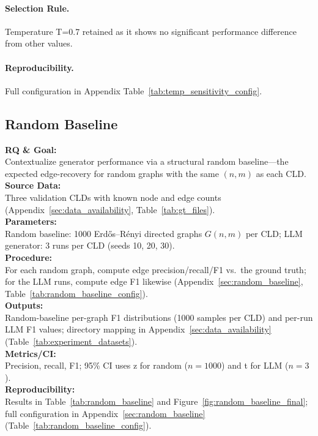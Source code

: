 \paragraph{Selection Rule.}
Temperature T=0.7 retained as it shows no significant performance difference from other values.

\paragraph{Reproducibility.}
Full configuration in Appendix Table~\ref{tab:temp_sensitivity_config}.

\subsection{Random Baseline}
\label{sec:random_baseline_method}

\noindent\textbf{RQ \& Goal:}\\
Contextualize generator performance via a structural random baseline---the expected edge-recovery for random graphs with the same $(n,m)$ as each CLD.\\
\textbf{Source Data:}\\
Three validation CLDs with known node and edge counts (Appendix~\ref{sec:data_availability}, Table~\ref{tab:gt_files}).\\
\textbf{Parameters:}\\
Random baseline: 1000 Erd\H{o}s--R\'enyi directed graphs $G(n,m)$ per CLD; LLM generator: 3 runs per CLD (seeds 10, 20, 30).\\
\textbf{Procedure:}\\
For each random graph, compute edge precision/recall/F1 vs.\ the ground truth; for the LLM runs, compute edge F1 likewise (Appendix~\ref{sec:random_baseline}, Table~\ref{tab:random_baseline_config}).\\
\textbf{Outputs:}\\
Random-baseline per-graph F1 distributions (1000 samples per CLD) and per-run LLM F1 values; directory mapping in Appendix~\ref{sec:data_availability} (Table~\ref{tab:experiment_datasets}).\\
\textbf{Metrics/CI:}\\
Precision, recall, F1; 95\% CI uses z for random ($n{=}1000$) and t for LLM ($n{=}3$).\\
\textbf{Reproducibility:}\\
Results in Table~\ref{tab:random_baseline} and Figure~\ref{fig:random_baseline_final}; full configuration in Appendix~\ref{sec:random_baseline} (Table~\ref{tab:random_baseline_config}).

